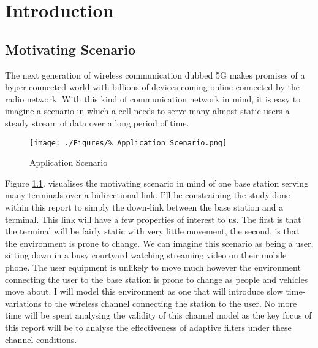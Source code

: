 \chapter{Introduction}

\section{Motivating Scenario}
The next generation of wireless communication %
dubbed 5G makes promises of a hyper connected %
world with billions of devices coming online %
connected by the radio network. With this kind %
of communication network in mind, it is easy %
to imagine a scenario in which a cell needs %
to serve many almost static users a steady stream %
of data over a long period of time.%

\begin{figure}[h!]
	\texttt{[image: ./Figures/\%
	Application\_Scenario.png]}
	\caption{Application Scenario}
	\label{fig:AppScene}
\end{figure}

Figure \ref{fig:AppScene}. visualises the motivating %
scenario in mind of one base station serving many %
terminals over a bidirectional link. I'll be constraining %
the study done within this report to simply the down-link %
between the base station and a terminal. This link will %
have a few properties of interest to us. The first is that %
the terminal will be fairly static with very little movement, %
the second, is that the environment is prone to change. We can %
imagine this scenario as being a user, sitting down in a busy %
courtyard watching streaming video on their mobile phone. The %
user equipment is unlikely to move much however the environment %
connecting the user to the base station is prone to change as %
people and vehicles move about. I will model this environment %
as one that will introduce slow time-variations to the wireless %
channel connecting the station to the user. No more time will be %
spent analysing the validity of this channel model as %
the key focus of this report will be to analyse the %
effectiveness of adaptive filters under these channel %
conditions.


